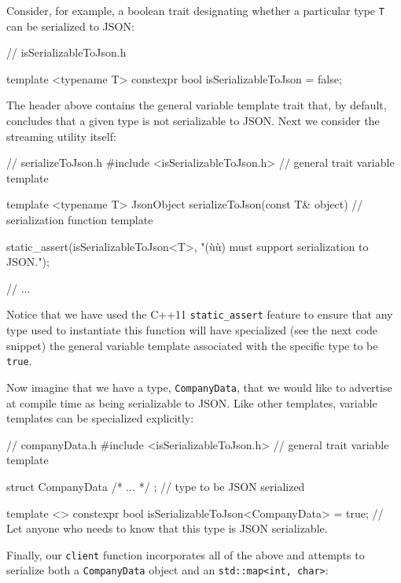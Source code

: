 Consider, for example, a boolean trait designating whether a particular
type \lstinline!T! can be serialized to JSON:

\begin{emcppslisting}[language=C++]
// isSerializableToJson.h

template <typename T>
constexpr bool isSerializableToJson = false;
\end{emcppslisting}
    
\noindent The header above contains the general variable template trait that, by
default, concludes that a given type is not serializable to JSON. Next
we consider the streaming utility itself:

\begin{emcppslisting}[language=C++]
// serializeToJson.h
#include <isSerializableToJson.h>  // general trait variable template

template <typename T>
JsonObject serializeToJson(const T& object)  // serialization function template
{
    static_assert(isSerializableToJson<T>,
                  "(ù{}ù) must support serialization to JSON.");

    // ...
}
\end{emcppslisting}
    
\noindent Notice that we have used the C++11
\lstinline!static_assert! feature to ensure that any type
used to instantiate this function will have specialized (see the next code snippet) the
general variable template associated with the specific type to be
\lstinline!true!.

Now imagine that we have a type, \lstinline!CompanyData!, that we would
like to advertise at compile time as being serializable to JSON. Like
other templates, variable templates can be specialized explicitly:

\begin{emcppslisting}[language=C++]
// companyData.h
#include <isSerializableToJson.h>  // general trait variable template

struct CompanyData { /* ... */ };  // type to be JSON serialized

template <>
constexpr bool isSerializableToJson<CompanyData> = true;
    // Let anyone who needs to know that this type is JSON serializable.
\end{emcppslisting}
    
\noindent Finally, our \lstinline!client! function incorporates all of the above and
attempts to serialize both a \lstinline!CompanyData! object and an
\lstinline!std::map<int,!~\lstinline!char>!:

